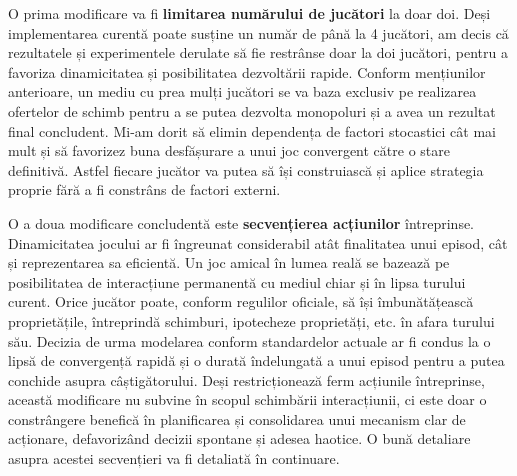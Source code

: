 O prima modificare va fi \textbf{limitarea numărului de jucători} la doar doi. Deși implementarea curentă poate susține un număr de până la 4 jucători, am decis că rezultatele și experimentele derulate să fie restrânse doar la doi jucători, pentru a favoriza dinamicitatea și posibilitatea dezvoltării rapide. Conform mențiunilor anterioare, un mediu cu prea mulți jucători se va baza exclusiv pe realizarea ofertelor de schimb pentru a se putea dezvolta monopoluri și a avea un rezultat final concludent. Mi-am dorit să elimin dependența de factori stocastici cât mai mult și să favorizez buna desfășurare a unui joc convergent către o stare definitivă. Astfel fiecare jucător va putea să își construiască și aplice strategia proprie fără a fi constrâns de factori externi.

O a doua modificare concludentă este \textbf{secvențierea acțiunilor} întreprinse. Dinamicitatea jocului ar fi îngreunat considerabil atât finalitatea unui episod, cât și reprezentarea sa eficientă. Un joc amical în lumea reală se bazează pe posibilitatea de interacțiune permanentă cu mediul chiar și în lipsa turului curent. Orice jucător poate, conform regulilor oficiale, să își îmbunătățească proprietățile, întreprindă schimburi, ipotecheze proprietăți, etc. în afara turului său. Decizia de urma modelarea conform standardelor actuale ar fi condus la o lipsă de convergență rapidă și o durată îndelungată a unui episod pentru a putea conchide asupra câștigătorului. Deși restricționează ferm acțiunile întreprinse, această modificare nu subvine în scopul schimbării interacțiunii, ci este doar o constrângere benefică în planificarea și consolidarea unui mecanism clar de acționare, defavorizând decizii spontane și adesea haotice. O bună detaliare asupra acestei secvențieri va fi detaliată în continuare.

